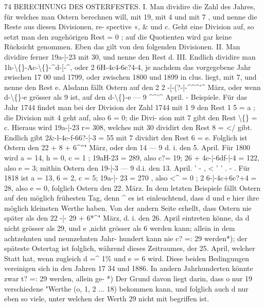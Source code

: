 \documentclass[12pt,a4paper]{article}
\begin{document}
       74  BERECHNUNG  DES  OSTERFESTES.
I.  Man  dividire  die  Zahl  des  Jahres,  für  welches  man  Ostern  berechnen
     will,  mit  19,  mit  4  und  mit  7  ,  und  nenne  die  Reste  aus  diesen  Divisionen,  re-
spective  «,  \&  und  c.  Geht  eine  Division  auf,  so  setzt  man  den  zugehörigen  Rest
=  0 ;  auf  die  Quotienten  wird  gar  keine  Rücksicht  genommen.  Eben  das  gilt
von  den  folgenden  Divisionen.
II.  Man  dividire  ferner   19a-|-23  mit  30,  und  nenne  den  Rest  d.
III.  Endlich  dividire  man  1h-\textbackslash\{\}-Ac-\textbackslash\{\}-\^{}d-[-\^{},  oder  2  6H-4c4-6c?4-4,  je
nachdem  das  vorgegebene  Jahr  zwischen  17  00  und  1799,  oder  zwischen  1800
und   1899  in clus.  liegt,  mit  7,  und  nenne  den  Rest  e.
Alsdann  fällt  Ostern  auf  den  2 2 -[-(?-|-\^{}\^{}\^{}'\^{}  März,  oder  wenn  d-\textbackslash\{\}-e  grösser
als  9  ist,  auf  den   d-\textbackslash\{\}-e  ---  9 \^{}\^{}'\^{}  April.
-  Beispiele.     Für  das  Jahr  1744  findet  man  bei  der  Division  der  Zahl  1744
mit  1 9  den  Rest  1 5  =  a ;  die  Division  mit  4  geht  auf,  also  6  =  0;  die  Divi-
sion mit  7  gibt  den  Rest  \textbackslash\{\}  =  c.  Hieraus  wird  19a-|-23  r=  308,  welches  mit
30  dividirt  den  Rest  8  =  </  gibt.  Endlich  gibt  2\&-l-4c-f-66?-|-3  =  55  mit  7
dividirt  den  Rest  6  =  e.  Folglich  ist  Ostern  den  22  +  8  +  6\^{}''"  März,  oder  den
14  ---  9  d.  i.  den  5.  April.
     Für  1800  wird  a  =  14,  h  =  0,  c  =  1  ;    19aH-23  =  289,   also  c?=  19;
26  +  4c-|-6df-|-4  =  122,  also  e  =  3;   mithin  Ostern  den  19-|-3  ---  9  d.i.   den
13.  April.      '    -      ,          <          '    '    .  -    
.    Für  1818  ist   a  =  13,    6  =  2,    c  =  5;     19a-|- 23  =  270 ,    also    <\^{}  =  0  ;
2  6-|-4c+6c?+4  =  28,  also  e  =  0,  folglich  Ostern  den  22.  März.
In  dem  letzten  Beispiele  fällt  Ostern  auf  den  möglich  frühesten  Tag,  denn
\^{}  es  ist  einleuchtend,  dass   d  und  e  hier  ihre  möglich  kleinsten  Werthe  haben.
Von  der  andern  Seite  erhellt,  dass  Ostern  nie  später  als  den  22  -|-  29  +  6*\^{}"  März,
d.  i.  den  26.  April  eintreten  könne,  da  d  nicht  grösser  als  29,  und  e  ,nicht
grösser  als  6  werden  kann;  allein  in  dem  achtzehnten  und  neunzehnten  Jahr-
hundert kann  nie  c?  =:  29  werden*);  der  späteste  Ostertag  ist  folglich,  während
dieses  Zeitraumes,  der  25.  April,  welcher  Statt  hat,  wenn  zugleich  d  =\^{}  1\%  und
e  =  6  wird.  Diese  beiden  Bedingungen  vereinigen  sich  in  den  Jahren  17  34
und  1886.     In  andern  Jahrhunderten  könnte  zwar   t?  =:  29    werden,  allein  ge-
*)  Der  Grund  davon  liegt  darin,  dass  o  nur  19  verschiedene  "Werthe    (o,    1,   2  ...  18)    bekommen
kann,  und  folglich  auch  d  nur  eben  so  viele,  unter  welchen  der  Werth  29  nicht  mit  begriffen  ist.
\end{document}
